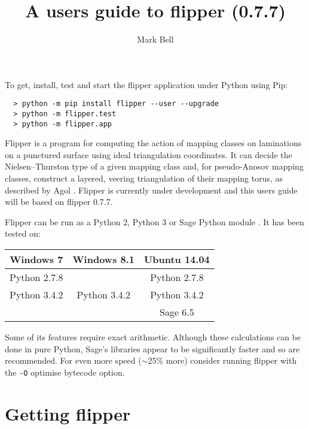 \documentclass[a4paper]{article}
\title{A users guide to flipper (0.7.7)}
\author{Mark Bell}
\begin{document}
\maketitle

\begin{center}
\begin{minipage}{0.8\linewidth}
\begin{framed}
  To get, install, test and start the flipper application under Python using Pip:
  \begin{lstlisting}
  > python -m pip install flipper --user --upgrade
  > python -m flipper.test
  > python -m flipper.app
  \end{lstlisting}
\end{framed}
\end{minipage}
\end{center}

Flipper is a program for computing the action of mapping classes on laminations on a punctured surface using ideal triangulation coordinates. It can decide the Nielsen--Thurston type of a given mapping class and, for pseudo-Anosov mapping classes, construct a layered, veering triangulation of their mapping torus, as described by Agol \cite{Agol}. Flipper is currently under development and this users guide will be based on flipper 0.7.7.

Flipper can be run as a Python 2, Python 3 or Sage Python module \cite{sage}. It has been tested on:

\begin{center}
\begin{tabular}{c|c|c}
Windows 7 & Windows 8.1 & Ubuntu 14.04 \\
\hline
Python 2.7.8 & & Python 2.7.8 \\
Python 3.4.2 & Python 3.4.2 & Python 3.4.2 \\
 & & Sage 6.5 \\
\end{tabular}
\end{center}

Some of its features require exact arithmetic. Although these calculations can be done in pure Python, Sage's libraries appear to be significantly faster and so are recommended. For even more speed ($\sim$25\% more) consider running flipper with the \texttt{-O} optimise bytecode option.

\section{Getting flipper}
\end{document}
